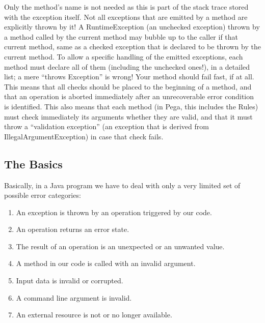 















Only the method’s name is not needed as this is part of the stack trace stored with the exception itself.
Not all exceptions that are emitted by a method are explicitly thrown by it! A RuntimeException (an unchecked exception) thrown by a method called by the current method may bubble up to the caller if that current method, same as a checked exception that is declared to be thrown by the current method.
To allow a specific handling of the emitted exceptions, each method must declare all of them (including the unchecked ones!), in a detailed list; a mere “throws Exception” is wrong!
Your method should fail fast, if at all. This means that all checks should be placed to the beginning of a method, and that an operation is aborted immediately after an unrecoverable error condition is identified.
This also means that each method (in Pega, this includes the Rules) must check immediately its arguments whether they are valid, and that it must throw a “validation exception” (an exception that is derived from IllegalArgumentException) in case that check fails.



\subsection{The Basics}
Basically, in a Java program we have to deal with only a very limited set of possible error categories:
\begin{enumerate}[nosep]
\item{An exception is thrown by an operation triggered by our code.}
\item{An operation returns an error state.}
\item{The result of an operation is an unexpected or an unwanted value.}
\item{A method in our code is called with an invalid argument.}
\item{Input data is invalid or corrupted.}
\item{A command line argument is invalid.}
\item{An external resource is not or no longer available.}
\end{enumerate}

